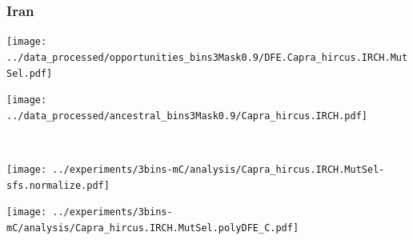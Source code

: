 \subsubsection{Iran}

\begin{minipage}{0.49\linewidth}
    \texttt{[image: ../data\_processed/opportunities\_bins3Mask0.9/DFE.Capra\_hircus.IRCH.MutSel.pdf]}
\end{minipage}
\begin{minipage}{0.49\linewidth}
    \texttt{[image: ../data\_processed/ancestral\_bins3Mask0.9/Capra\_hircus.IRCH.pdf]}
\end{minipage}
\\
\begin{minipage}{0.49\linewidth}
    \texttt{[image: ../experiments/3bins-mC/analysis/Capra\_hircus.IRCH.MutSel-sfs.normalize.pdf]}
\end{minipage}
\begin{minipage}{0.4\linewidth}
    \texttt{[image: ../experiments/3bins-mC/analysis/Capra\_hircus.IRCH.MutSel.polyDFE\_C.pdf]}
\end{minipage}
